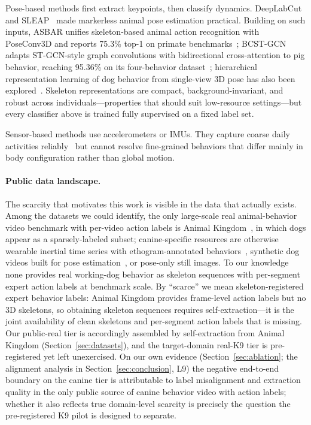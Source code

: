Pose-based methods first extract keypoints, then classify dynamics. DeepLabCut~\citep{mathis2018dlc} and SLEAP~\citep{pereira2022sleap} made markerless animal pose estimation practical. Building on such inputs, ASBAR unifies skeleton-based animal action recognition with PoseConv3D and reports 75.3\% top-1 on primate benchmarks~\citep{asbar2024}; BCST-GCN adapts ST-GCN-style graph convolutions with bidirectional cross-attention to pig behavior, reaching 95.36\% on its four-behavior dataset~\citep{bcstgcn2026}; hierarchical representation learning of dog behavior from single-view 3D pose has also been explored~\citep{miyai2025workshop}. Skeleton representations are compact, background-invariant, and robust across individuals---properties that should suit low-resource settings---but every classifier above is trained fully supervised on a fixed label set.

Sensor-based methods use accelerometers or IMUs. They capture coarse daily activities reliably~\citep{plosone2023imu} but cannot resolve fine-grained behaviors that differ mainly in body configuration rather than global motion.

\paragraph{Public data landscape.}
The scarcity that motivates this work is visible in the data that actually exists. Among the datasets we could identify, the only large-scale real animal-behavior video benchmark with per-video action labels is Animal Kingdom~\citep{ng2022animalkingdom}, in which dogs appear as a sparsely-labeled subset; canine-specific resources are otherwise wearable inertial time series with ethogram-annotated behaviors~\citep{vehkaoja2022dogsensor,plosone2023imu}, synthetic dog videos built for pose estimation~\citep{shooter2024sydogvideo}, or pose-only still images. To our knowledge none provides real working-dog behavior as skeleton sequences with per-segment expert action labels at benchmark scale. By ``scarce'' we mean skeleton-registered expert behavior labels: Animal Kingdom provides frame-level action labels but no 3D skeletons, so obtaining skeleton sequences requires self-extraction---it is the joint availability of clean skeletons and per-segment action labels that is missing. Our public-real tier is accordingly assembled by self-extraction from Animal Kingdom (Section~\ref{sec:datasets}), and the target-domain real-K9 tier is pre-registered yet left unexercised. On our own evidence (Section~\ref{sec:ablation}; the alignment analysis in Section~\ref{sec:conclusion}, L9) the negative end-to-end boundary on the canine tier is attributable to label misalignment and extraction quality in the only public source of canine behavior video with action labels; whether it also reflects true domain-level scarcity is precisely the question the pre-registered K9 pilot is designed to separate.

